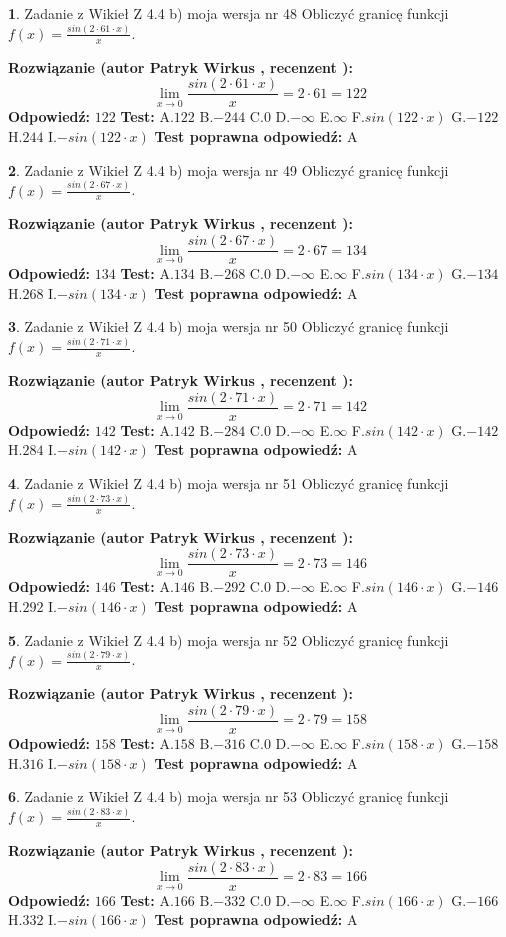 \documentclass[12pt, a4paper]{article}
\theoremstyle{definition} %
\newtheorem{zad}{}
\newcommand{\zadStart}[1]{\begin{zad}#1\newline}
\newcommand{\zadStop}{\end{zad}}
\newcommand{\rozwStart}[2]{\noindent \textbf{Rozwiązanie (autor #1 , recenzent #2): }\newline}
\newcommand{\rozwStop}{\newline}
\newcommand{\odpStart}{\noindent \textbf{Odpowiedź:}\newline}
\newcommand{\odpStop}{\newline}
\newcommand{\testStart}{\noindent \textbf{Test:}\newline}
\newcommand{\testStop}{\newline}
\newcommand{\kluczStart}{\noindent \textbf{Test poprawna odpowiedź:}\newline}
\newcommand{\kluczStop}{\newline}
\begin{document}
\zadStart{Zadanie z Wikieł Z 4.4 b) moja wersja nr 48}
Obliczyć granicę funkcji $f(x)=\frac{sin(2 \cdot61\cdot x)}{x}$.
\zadStop
\rozwStart{Patryk Wirkus}{}
$$\lim\limits_{x\to 0}\frac{sin(2 \cdot 61\cdot x)}{x}=
2 \cdot 61 = 122$$
\rozwStop
\odpStart
$122$
\odpStop
\testStart
A.$122$
B.$-244$
C.$0$
D.$-\infty$
E.$\infty$
F.$sin(122\cdot x)$
G.$-122$
H.$244$
I.$-sin(122\cdot x)$
\testStop
\kluczStart
A
\kluczStop



\zadStart{Zadanie z Wikieł Z 4.4 b) moja wersja nr 49}
Obliczyć granicę funkcji $f(x)=\frac{sin(2 \cdot67\cdot x)}{x}$.
\zadStop
\rozwStart{Patryk Wirkus}{}
$$\lim\limits_{x\to 0}\frac{sin(2 \cdot 67\cdot x)}{x}=
2 \cdot 67 = 134$$
\rozwStop
\odpStart
$134$
\odpStop
\testStart
A.$134$
B.$-268$
C.$0$
D.$-\infty$
E.$\infty$
F.$sin(134\cdot x)$
G.$-134$
H.$268$
I.$-sin(134\cdot x)$
\testStop
\kluczStart
A
\kluczStop



\zadStart{Zadanie z Wikieł Z 4.4 b) moja wersja nr 50}
Obliczyć granicę funkcji $f(x)=\frac{sin(2 \cdot71\cdot x)}{x}$.
\zadStop
\rozwStart{Patryk Wirkus}{}
$$\lim\limits_{x\to 0}\frac{sin(2 \cdot 71\cdot x)}{x}=
2 \cdot 71 = 142$$
\rozwStop
\odpStart
$142$
\odpStop
\testStart
A.$142$
B.$-284$
C.$0$
D.$-\infty$
E.$\infty$
F.$sin(142\cdot x)$
G.$-142$
H.$284$
I.$-sin(142\cdot x)$
\testStop
\kluczStart
A
\kluczStop



\zadStart{Zadanie z Wikieł Z 4.4 b) moja wersja nr 51}
Obliczyć granicę funkcji $f(x)=\frac{sin(2 \cdot73\cdot x)}{x}$.
\zadStop
\rozwStart{Patryk Wirkus}{}
$$\lim\limits_{x\to 0}\frac{sin(2 \cdot 73\cdot x)}{x}=
2 \cdot 73 = 146$$
\rozwStop
\odpStart
$146$
\odpStop
\testStart
A.$146$
B.$-292$
C.$0$
D.$-\infty$
E.$\infty$
F.$sin(146\cdot x)$
G.$-146$
H.$292$
I.$-sin(146\cdot x)$
\testStop
\kluczStart
A
\kluczStop



\zadStart{Zadanie z Wikieł Z 4.4 b) moja wersja nr 52}
Obliczyć granicę funkcji $f(x)=\frac{sin(2 \cdot79\cdot x)}{x}$.
\zadStop
\rozwStart{Patryk Wirkus}{}
$$\lim\limits_{x\to 0}\frac{sin(2 \cdot 79\cdot x)}{x}=
2 \cdot 79 = 158$$
\rozwStop
\odpStart
$158$
\odpStop
\testStart
A.$158$
B.$-316$
C.$0$
D.$-\infty$
E.$\infty$
F.$sin(158\cdot x)$
G.$-158$
H.$316$
I.$-sin(158\cdot x)$
\testStop
\kluczStart
A
\kluczStop



\zadStart{Zadanie z Wikieł Z 4.4 b) moja wersja nr 53}
Obliczyć granicę funkcji $f(x)=\frac{sin(2 \cdot83\cdot x)}{x}$.
\zadStop
\rozwStart{Patryk Wirkus}{}
$$\lim\limits_{x\to 0}\frac{sin(2 \cdot 83\cdot x)}{x}=
2 \cdot 83 = 166$$
\rozwStop
\odpStart
$166$
\odpStop
\testStart
A.$166$
B.$-332$
C.$0$
D.$-\infty$
E.$\infty$
F.$sin(166\cdot x)$
G.$-166$
H.$332$
I.$-sin(166\cdot x)$
\testStop
\kluczStart
A
\kluczStop
\end{document}
